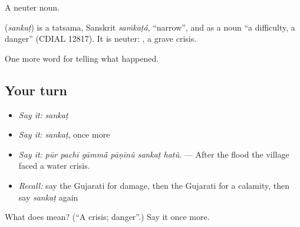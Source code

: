 A neuter noun.

\begin{cousinweb}
\textbf{} (\emph{sankaṭ}) is a tatsama, Sanskrit \emph{saṁkaṭá}, \textquotedblleft{}narrow\textquotedblright{}, and as a noun \textquotedblleft{}a difficulty, a danger\textquotedblright{} (CDIAL 12817). It is neuter: \textbf{ }, a grave crisis.
\end{cousinweb}

\begin{grammarlens}[title={What you've built}]
One more word for telling what happened.
\end{grammarlens}

\subsection*{Your turn}
\begin{itemize}
\raggedright
  \item \emph{Say it:} \emph{sankaṭ}
  \item \emph{Say it:} \emph{sankaṭ}, once more
  \item \emph{Say it:} \emph{pūr pachī gāmmā̃ pāṇīnũ sankaṭ hatũ.} — After the flood the village faced a water crisis.
  \item \emph{Recall:} say the Gujarati for damage, then the Gujarati for a calamity, then say \emph{sankaṭ} again
\end{itemize}

\begin{tcolorbox}[breakable,colback=teal!4,colframe=teal!35!black,title={Before you move on}]
What does  mean? (\textquotedblleft{}A crisis; danger\textquotedblright{}.) Say it once more.
\end{tcolorbox}
